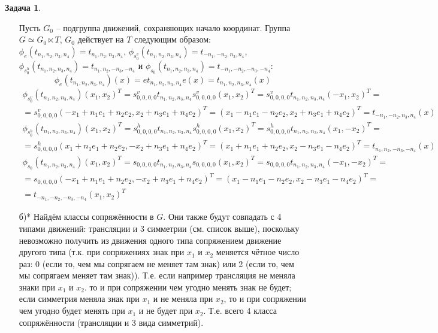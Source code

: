 \documentclass[12pt]{article}
\theoremstyle{definition}
\newtheorem{zad}{Задача}[section]
\begin{document}
\begin{zad}
\begin{itemize}
    Пусть $G_0$ -- подгруппа движений, сохраняющих начало координат. Группа $G\simeq G_0\ltimes T$, $G_0$ действует на $T$ следующим образом: $\phi_e(t_{n_1,n_2,n_3,n_4})=t_{n_1,n_2,n_3,n_4}$, $\phi_{s_0^v}(t_{n_1,n_2,n_3,n_4})=t_{-n_1,-n_2,n_3,n_4}$, $\phi_{s_0^h}(t_{n_1,n_2,n_3,n_4})=t_{n_1,n_2,-n_3,-n_4}$ и $\phi_{s_0}(t_{n_1,n_2,n_3,n_4})=t_{-n_1,-n_2,-n_3,-n_4}$:
    \begin{equation*}
        \phi_e(t_{n_1,n_2,n_3,n_4})(x)=et_{n_1,n_2,n_3,n_4}e(x)=t_{n_1,n_2,n_3,n_4}(x)
    \end{equation*}
    \begin{multline*}
        \phi_{s_0^v}(t_{n_1,n_2,n_3,n_4})(x_1,x_2)^T=s^v_{0,0,0,0}t_{n_1,n_2,n_3,n_4}s^v_{0,0,0,0}(x_1,x_2)^T=s^v_{0,0,0,0}t_{n_1,n_2,n_3,n_4}(-x_1,x_2)^T=\\=s^v_{0,0,0,0}(-x_1+n_1e_1+n_2e_2, x_2+n_3e_1+n_4e_2)^T=(x_1-n_1e_1-n_2e_2,x_2+n_3e_1+n_4e_2)^T=t_{-n_1,-n_2,n_3,n_4}(x)
    \end{multline*}
    \begin{multline*}
        \phi_{s_0^h}(t_{n_1,n_2,n_3,n_4})(x_1,x_2)^T=s^h_{0,0,0,0}t_{n_1,n_2,n_3,n_4}s^h_{0,0,0,0}(x_1,x_2)^T=s^h_{0,0,0,0}t_{n_1,n_2,n_3,n_4}(x_1,-x_2)^T=\\=s^h_{0,0,0,0}(x_1+n_1e_1+n_2e_2,-x_2+n_3e_1+n_4e_2)^T=(x_1+n_1e_1+n_2e_2,x_2-n_3e_1-n_4e_2)^T=t_{n_1,n_2,-n_3,-n_4}(x)
    \end{multline*}
    \begin{multline*}
        \phi_{s_0}(t_{n_1,n_2,n_3,n_4})(x_1,x_2)^T=s_{0,0,0,0}t_{n_1,n_2,n_3,n_4}s_{0,0,0,0}(x_1,x_2)^T=s_{0,0,0,0}t_{n_1,n_2,n_3,n_4}(-x_1,-x_2)^T=\\=s_{0,0,0,0}(-x_1+n_1e_1+n_2e_2,-x_2+n_3e_1+n_4e_2)^T=(x_1-n_1e_1-n_2e_2,x_2-n_3e_1-n_4e_2)^T=\\=t_{-n_1,-n_2,-n_3,-n_4}(x_1,x_2)^T
    \end{multline*}
    \item[б)*] Найдём классы сопряжённости в $G$. Они также будут совпадать с 4 типами движений: трансляции и 3 симметрии (см. список выше), поскольку невозможно получить из движения одного типа сопряжением движение другого типа (т.к. при сопряжениях знак при $x_1$ и $x_2$ меняется чётное число раз: 0 (если то, чем мы сопрягаем не меняет там знак) или 2 (если то, чем мы сопрягаем меняет там знак)). Т.е. если например трансляция не меняла знаки при $x_1$ и $x_2$. то и при сопряжении чем угодно менять знак не будет; если симметрия меняла знак при $x_1$ и не меняла при $x_2$, то и при сопряжении чем угодно будет менять при $x_1$ и не будет при $x_2$. Т.е. всего 4 класса сопряжённости (трансляции и 3 вида симметрий).
\end{itemize}
\end{zad}
\end{document}
